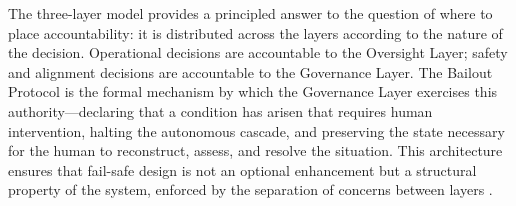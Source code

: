 The three-layer model provides a principled answer to the question of
where to place accountability: it is distributed across the layers
according to the nature of the decision.  Operational decisions are
accountable to the Oversight Layer; safety and alignment decisions
are accountable to the Governance Layer.  The Bailout Protocol is
the formal mechanism by which the Governance Layer exercises this
authority—declaring that a condition has arisen that requires human
intervention, halting the autonomous cascade, and preserving the
state necessary for the human to reconstruct, assess, and resolve
the situation.  This architecture ensures that fail-safe design is
not an optional enhancement but a structural property of the system,
enforced by the separation of concerns between layers
\cite{dijkstra1982}.
